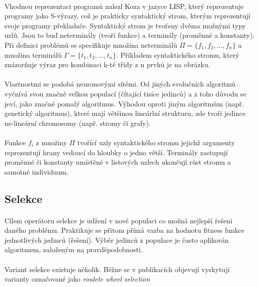 \documentclass[bc,male,java,dept460]{diploma}		%
\begin{document}
\paragraph*{}
Vhodnou reprezentaci programů nalezl Koza v jazyce LISP, který reprezentuje programy jako S-výrazy, což je prakticky syntaktický strom, kterým reprezentují svoje programy překladače. Syntaktický strom je tvořeny dvěma možnými typy uzlů. Jsou to buď neterminály (tvoří funkce) a terminály (proměnné a konstanty). Při definici problémů se specifikuje množina neterminálů $\Pi=\{f_1,f_2,...,f_n\}$ a množina terminálů $\Gamma=\{t_1,t_2,...,t_n\}$. Příkladem syntaktického stromu, který znázorňuje výraz pro kombinaci k-té třídy z n prvků je na obrázku.

\paragraph*{}
Vlastnostmi se podobá neuronovými sítěmi. Od jiných evolučních algoritmů vyčnívá svou značně velkou populací (čítající tisíce jedinců) a z toho důvodu se jeví, jako značně pomalý algoritmus. Výhodou oproti jiným algoritmům (např. genetický algoritmus), které mají většinou lineárlní strukturu, zde tvoři jedince ne-lineární chromosomy (např. stromy či grafy).

\paragraph*{}
Funkce $f_i$ z množiny $\Pi$ tvořící uzly syntaktického stromu jejichž argumenty reprezentují hrany vedoucí do hloubky o jedno větší. Terminály zastupují proměnné či konstanty umístěné v listových uzlech ukončují růst stromu a samotné individuum.

\subsection{Selekce}
\paragraph*{}
Cílem operátoru selekce je udžení v nové populaci co možná nejlepší řešení daného problému. Praktikuje se přitom přímá vazba na hodnotu fitness funkce jednotlivých jedinců (řešení). Výběr jedinců z populace je často aplikován  algoritmem, založeným na pravděpodobnosti.

\paragraph*{}
Variant selekce existuje několik. Běžne se v publikacích objevují vyskytují varianty označované jako \textit{roulete wheel selection}
\end{document}
